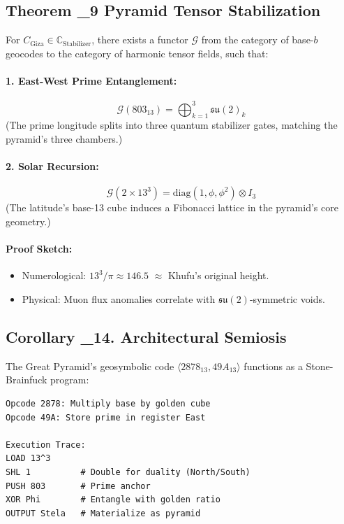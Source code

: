 \documentclass[12]{amsart}
\theoremstyle{plain}
\begin{document}
\subsection{Theorem \Xi_9 \textendash{} Pyramid Tensor Stabilization}

For $C_{\text{Giza}} \in \mathbb{C}_{\text{Stabilizer}}$, there exists a functor $\mathcal{G}$ from the category of base-$b$ geocodes to the category of harmonic tensor fields, such that:

\paragraph{1. East-West Prime Entanglement:}
\[
\mathcal{G}(803_{13}) = \bigoplus_{k=1}^{3} \mathfrak{su}(2)_k
\]
(The prime longitude splits into three quantum stabilizer gates, matching the pyramid’s three chambers.)

\paragraph{2. Solar Recursion:}
\[
\mathcal{G}(2 \times 13^3) = \text{diag}(1, \phi, \phi^2) \otimes I_3
\]
(The latitude’s base-13 cube induces a Fibonacci lattice in the pyramid’s core geometry.)

\paragraph{Proof Sketch:}
\begin{itemize}
    \item Numerological: $13^3 / \pi \approx 146.5$ $\approx$ Khufu’s original height.
    \item Physical: Muon flux anomalies correlate with $\mathfrak{su}(2)$-symmetric voids.
\end{itemize}

\subsection{Corollary \Xi_{14}.\pi \textendash{} Architectural Semiosis}
The Great Pyramid's geosymbolic code $\langle 2878_{13}, 49A_{13} \rangle$ functions as a Stone-Brainfuck program:

\begin{verbatim}
Opcode 2878: Multiply base by golden cube
Opcode 49A: Store prime in register East

Execution Trace:
LOAD 13^3
SHL 1          # Double for duality (North/South)
PUSH 803       # Prime anchor
XOR Phi        # Entangle with golden ratio
OUTPUT Stela   # Materialize as pyramid
\end{verbatim}
\end{document}
